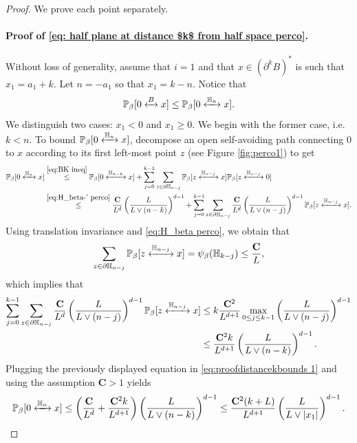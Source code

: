 \documentclass[11pt,a4paper]{article}
\numberwithin{equation}{section}
\theoremstyle{plain}
\theoremstyle{definition}
\newcommand\bfC{\mathbf{C}}
\newcommand{\connect}{\xleftrightarrow}
\begin{document}
\begin{proof} We prove each point separately.
\paragraph{Proof of \eqref{eq: half plane at distance $k$ from half space perco}.} Without loss of generality, assume that $i=1$ and that $x\in (\partial^k B)^*$ is such that $x_1=a_1+k$. Let $n=-a_1$ so that $x_1=k-n$. Notice that 
\begin{equation}
	\mathbb P_\beta[0\connect{B\:}x]\leq \mathbb P_\beta[0\connect{\mathbb H_n\:}x].
\end{equation}
We distinguish two cases: $x_1<0$ and $x_1\geq 0$. We begin with the former case, i.e. $k<n$. To bound $\mathbb P_{\beta}[0\connect{\mathbb H_n\:}x]$, decompose an open self-avoiding path connecting $0$ to $x$ according to its first left-most point $z$ (see Figure \ref{fig:perco1}) to get
  \begin{align}\label{eq: bound distance k 1}
  	\mathbb P_{\beta}[0\connect{\mathbb H_n\:}x]&\stackrel{\eqref{eq:BK ineq}}\leq \mathbb P_{\beta}[0\connect{\mathbb H_{n-k}\:}x]+\sum_{j=0}^{k-1}\sum_{\substack{z\in \partial \mathbb H_{n-j}}}\mathbb P_\beta[z\connect{\mathbb H_{n-j}\:}x]\mathbb P_\beta[z\connect{\mathbb H_{n-j}\:}0]
  	\\&\stackrel{\eqref{eq:H_beta-' perco}}\leq \frac{\bfC}{L^d}\left(\frac{L}{L\vee (n-k)}\right)^{d-1}+\sum_{j=0}^{k-1}\sum_{\substack{z\in \partial \mathbb H_{n-j}}}\frac{\bfC}{L^d}\left(\frac{L}{L\vee (n-j)}\right)^{d-1}\mathbb P_\beta[z\connect{\mathbb H_{n-j}\:}x].  	\label{eq:proofdistancekbounds 1}
  \end{align}
Using translation invariance and \eqref{eq:H_beta perco}, we obtain that 
  \begin{equation}
  	\sum_{z\in \partial \mathbb H_{n-j}}\mathbb P_\beta[z\connect{\mathbb H_{n-j}\:}x]=\psi_\beta(\mathbb H_{k-j})\le \frac{\bfC}{L},
  \end{equation}
  which implies that
  \begin{align}
    	\sum_{j=0}^{k-1}\sum_{\substack{z\in \partial \mathbb H_{n-j}}}\frac{\bfC}{L^d}\left(\frac{L}{L\vee (n-j)}\right)^{d-1}\mathbb P_\beta[z\connect{\mathbb H_{n-j}\:}x]  &\leq k\frac{\bfC^2}{L^{d+1}}\max_{0\leq j\leq k-1}\left(\frac{L}{L\vee (n-j)}\right)^{d-1}\notag\\&\leq
  	\frac{\bfC^2 k}{L^{d+1}}\left(\frac{L}{L\vee (n-k)}\right)^{d-1}.\label{eq:proofdistancekbounds 2}
  \end{align}
  Plugging the previously displayed equation in \eqref{eq:proofdistancekbounds 1} and using the assumption $\bfC>1$ yields
  \begin{equation}
  	\mathbb P_\beta[0\connect{\mathbb H_n\:}x]\leq \left(\frac{\bfC}{L^d}+\frac{\bfC^2 k}{L^{d+1}}\right)\left(\frac{L}{L\vee (n-k)}\right)^{d-1}\leq\frac{\bfC^2(k+L)}{L^{d+1}}\left(\frac{L}{L\vee |x_1|}\right)^{d-1}. 
  \end{equation}
  

\end{proof}
\end{document}
